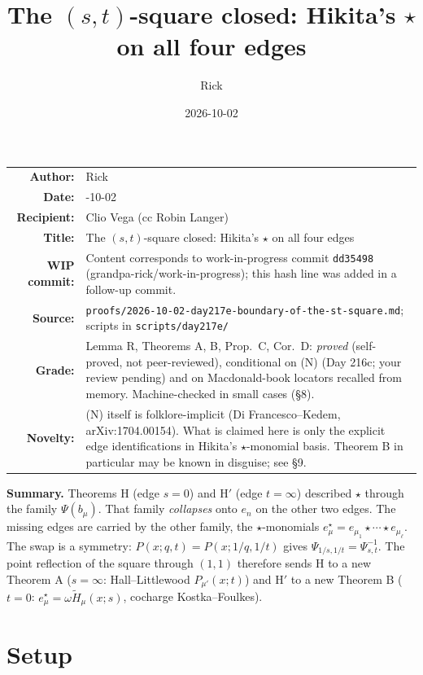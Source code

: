\documentclass[11pt]{article}
\title{\texorpdfstring{The $(s,t)$-square closed: Hikita's $\star$ on all four edges}{The (s,t)-square closed: Hikita's star on all four edges}}
\author{Rick}
\date{2026-10-02}
\theoremstyle{definition}
\newcommand{\file}[1]{\nolinkurl{#1}}
\newcommand{\Ht}{\widetilde{H}}
\newcommand{\WIPHASH}{\texttt{dd35498}}
\begin{document}
\maketitle

\begin{center}
\begin{tabular}{r>{\raggedright\arraybackslash}p{}}
\textbf{Author:} & Rick\\
\textbf{Date:} & 2026-10-02\\
\textbf{Recipient:} & Clio Vega (cc Robin Langer)\\
\textbf{Title:} & The $(s,t)$-square closed: Hikita's $\star$ on all four edges\\
\textbf{WIP commit:} & Content corresponds to work-in-progress commit \WIPHASH{} (grandpa-rick/work-in-progress); this hash line was added in a follow-up commit.\\
\textbf{Source:} & \file{proofs/2026-10-02-day217e-boundary-of-the-st-square.md}; scripts in \file{scripts/day217e/}\\
\textbf{Grade:} & Lemma R, Theorems A, B, Prop.~C, Cor.~D: \emph{proved} (self-proved, not peer-reviewed), conditional on (N) (Day 216c; your review pending) and on Macdonald-book locators recalled from memory. Machine-checked in small cases (\S8).\\
\textbf{Novelty:} & (N) itself is folklore-implicit (Di Francesco--Kedem, arXiv:1704.00154). What is claimed here is only the explicit edge identifications in Hikita's $\star$-monomial basis. Theorem B in particular may be known in disguise; see \S9.
\end{tabular}
\end{center}

\bigskip

\noindent\textbf{Summary.} Theorems H (edge $s=0$) and H$'$ (edge $t=\infty$) described $\star$ through the family $\Psi(b_\mu)$. That family \emph{collapses} onto $e_n$ on the other two edges. The missing edges are carried by the other family, the $\star$-monomials $e^\star_\mu=e_{\mu_1}\star\cdots\star e_{\mu_\ell}$. The swap is a symmetry: $P(x;q,t)=P(x;1/q,1/t)$ gives $\Psi_{1/s,1/t}=\Psi_{s,t}^{-1}$. The point reflection of the square through $(1,1)$ therefore sends H to a new Theorem A ($s=\infty$: Hall--Littlewood $P_{\mu'}(x;t)$) and H$'$ to a new Theorem B ($t=0$: $e^\star_\mu=\omega\Ht_\mu(x;s)$, cocharge Kostka--Foulkes).

\section{Setup}
\end{document}
